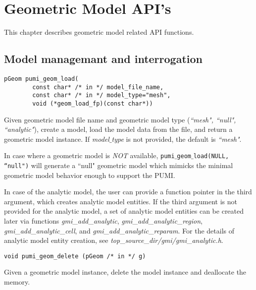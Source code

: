 \section{Geometric Model API's}

This chapter describes geometric model related API functions.

\subsection{Model  managemant and interrogation}

\begin{verbatim}
pGeom pumi_geom_load(
        const char* /* in */ model_file_name, 
        const char* /* in */ model_type="mesh",
        void (*geom_load_fp)(const char*))
\end{verbatim}
\vspace{-.5cm}\hspace{1cm}
	Given geometric model file name and geometric model type (\textit{``mesh", ``null", ``analytic"}), create a model, load the model data from the file, and return a geometric model instance. If \emph{model}$\_$\emph{type} is not provided, the default is \emph{``mesh"}.

In case where a geometric model is \emph{NOT} available, \texttt{pumi$\_$geom$\_$load(NULL, ``null")} will generate a ``null" geometric model which mimicks the minimal geometric model behavior enough to support the PUMI.

In case of the analytic model, the user can provide a function pointer in the third argument, which creates analytic model entities. If the third argument is not provided for the analytic model, a set of analytic model entities can be created later via functions \emph{gmi}\_\emph{add}\_\emph{analytic}, \emph{gmi}\_\emph{add}\_\emph{analytic}\_\emph{region}, \emph{gmi}\_\emph{add}\_\emph{analytic}\_\emph{cell}, and \emph{gmi}\_\emph{add}\_\emph{analytic}\_\emph{reparam}. For the details of analytic model entity creation, see \emph{top}\_\emph{source}\_\emph{dir/gmi/gmi}\_\emph{analytic.h}.

\begin{verbatim}	
void pumi_geom_delete (pGeom /* in */ g)
\end{verbatim}\vspace{-.5cm}\hspace{1cm}	
Given a geometric model instance, delete the model instance and deallocate the memory.

